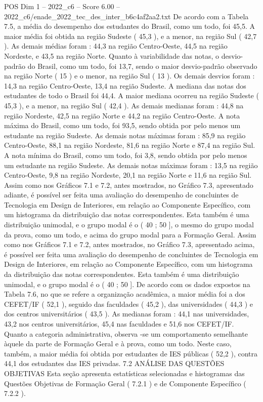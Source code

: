 \begin{textsample}{POS Dim 1 – 2022\_c6 – Score 6.00 – 2022\_c6/enade\_2022\_tec\_des\_inter\_b6c4af2aa2.txt}
De acordo com a Tabela 7.5, a média do desempenho dos estudantes do Brasil, como um todo, foi 45,5.
A maior média foi obtida na região Sudeste ( 45,3 ), e a menor, na região Sul ( 42,7 ).
As demais médias foram : 44,3 na região Centro-Oeste, 44,5 na região Nordeste, e 43,5 na região Norte.
Quanto à variabilidade das notas, o desvio-padrão do Brasil, como um todo, foi 13,7, sendo o maior desvio-padrão observado na região Norte ( 15 ) e o menor, na região Sul ( 13 ).
Os demais desvios foram : 14,3 na região Centro-Oeste, 13,4 na região Sudeste.
A mediana das notas dos estudantes de todo o Brasil foi 44,4.
A maior mediana ocorreu na região Sudeste ( 45,3 ), e a menor, na região Sul ( 42,4 ).
As demais medianas foram : 44,8 na região Nordeste, 42,5 na região Norte e 44,2 na região Centro-Oeste.
A nota máxima do Brasil, como um todo, foi 93,5, sendo obtida por pelo menos um estudante na região Sudeste.
As demais notas máximas foram : 85,9 na região Centro-Oeste, 88,1 na região Nordeste, 81,6 na região Norte e 87,4 na região Sul.
A nota mínima do Brasil, como um todo, foi 3,8, sendo obtida por pelo menos um estudante na região Sudeste.
As demais notas máximas foram : 13,5 na região Centro-Oeste, 9,8 na região Nordeste, 20,1 na região Norte e 11,6 na região Sul.
Assim como nos Gráficos 7.1 e 7.2, antes mostrados, no Gráfico 7.3, apresentado adiante, é possível ser feita uma avaliação do desempenho de concluintes de Tecnologia em Design de Interiores, em relação ao Componente Específico, com um histograma da distribuição das notas correspondentes.
Esta também é uma distribuição unimodal, e o grupo modal é o ( 40 ; 50 ], o mesmo do grupo modal da prova, como um todo, e acima do grupo modal para a Formação Geral.
Assim como nos Gráficos 7.1 e 7.2, antes mostrados, no Gráfico 7.3, apresentado acima, é possível ser feita uma avaliação do desempenho de concluintes de Tecnologia em Design de Interiores, em relação ao Componente Específico, com um histograma da distribuição das notas correspondentes.
Esta também é uma distribuição unimodal, e o grupo modal é o ( 40 ; 50 ].
De acordo com os dados expostos na Tabela 7.6, no que se refere a organização acadêmica, a maior média foi a dos CEFET/IF ( 52,1 ), seguido das faculdades ( 45,2 ), das universidades ( 44,3 ) e dos centros universitários ( 43,5 ).
As medianas foram : 44,1 nas universidades, 43,2 nos centros universitários, 45,4 nas faculdades e 51,6 nos CEFET/IF.
Quanto a categoria administrativa, observa -se um comportamento semelhante àquele da parte de Formação Geral e à prova, como um todo.
Neste caso, também, a maior média foi obtida por estudantes de IES públicas ( 52,2 ), contra 44,1 dos estudantes das IES privadas. 7.2 ANÁLISE DAS QUESTÕES OBJETIVAS Esta seção apresenta estatísticas selecionadas e histogramas das Questões Objetivas de Formação Geral ( 7.2.1 ) e de Componente Específico ( 7.2.2 ).

\end{textsample}
